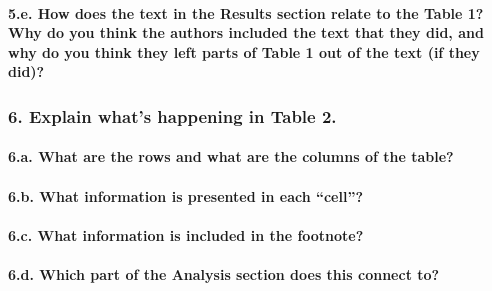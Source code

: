 \documentclass[]{article}
\let\oldparagraph\paragraph
\renewcommand{\paragraph}[1]{\oldparagraph{#1}\mbox{}}
\begin{document}
\hypertarget{e.-how-does-the-text-in-the-results-section-relate-to-the-table-1-why-do-you-think-the-authors-included-the-text-that-they-did-and-why-do-you-think-they-left-parts-of-table-1-out-of-the-text-if-they-did}{%
\paragraph{5.e. How does the text in the Results section relate to the
Table 1? Why do you think the authors included the text that they did,
and why do you think they left parts of Table 1 out of the text (if they
did)?}\label{e.-how-does-the-text-in-the-results-section-relate-to-the-table-1-why-do-you-think-the-authors-included-the-text-that-they-did-and-why-do-you-think-they-left-parts-of-table-1-out-of-the-text-if-they-did}}

\hypertarget{explain-whats-happening-in-table-2.}{%
\subsubsection{6. Explain what's happening in Table
2.}\label{explain-whats-happening-in-table-2.}}

\hypertarget{a.-what-are-the-rows-and-what-are-the-columns-of-the-table-1}{%
\paragraph{6.a. What are the rows and what are the columns of the
table?}\label{a.-what-are-the-rows-and-what-are-the-columns-of-the-table-1}}

\hypertarget{b.-what-information-is-presented-in-each-cell-1}{%
\paragraph{6.b. What information is presented in each
``cell''?}\label{b.-what-information-is-presented-in-each-cell-1}}

\hypertarget{c.-what-information-is-included-in-the-footnote-1}{%
\paragraph{6.c. What information is included in the
footnote?}\label{c.-what-information-is-included-in-the-footnote-1}}

\hypertarget{d.-which-part-of-the-analysis-section-does-this-connect-to-1}{%
\paragraph{6.d. Which part of the Analysis section does this connect
to?}\label{d.-which-part-of-the-analysis-section-does-this-connect-to-1}}
\end{document}
